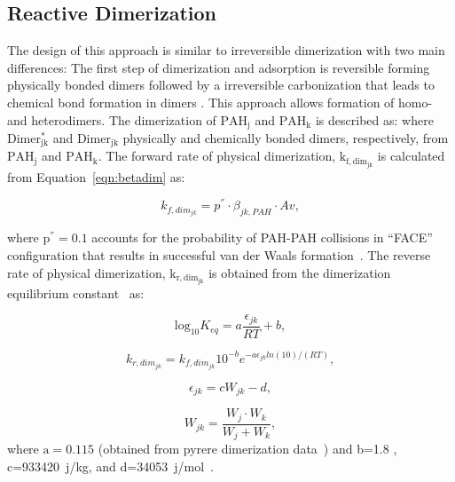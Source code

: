 \subsection{Reactive Dimerization}
The design of this approach is similar to irreversible dimerization with two main differences: The first step of dimerization and adsorption is reversible forming physically bonded dimers followed by a irreversible carbonization that leads to chemical bond formation in dimers \citep{kholghy2018reactive}. This approach allows formation of homo- and heterodimers. The dimerization of $\mathrm{PAH_j}$ and $\mathrm{PAH_k}$ is described as:
\noindent where $\mathrm{Dimer^*_{jk}}$ and $\mathrm{Dimer_{jk}}$ physically and chemically bonded dimers, respectively, from $\mathrm{PAH_j}$ and $\mathrm{PAH_k}$. The forward rate of physical dimerization, $\mathrm{k_{f,dim_{jk}}}$ is calculated from Equation~\eqref{eqn:betadim} as:

\begin{equation}
	k_{f,dim_{jk}}=
	p^{''}\cdot\beta_{jk,PAH}\cdot Av
	\label{eqn:kfphydim_reacdim},
\end{equation}

where $\mathrm{p^{''}}=0.1$ accounts for the probability of PAH-PAH collisions in “FACE” configuration that results in successful van der Waals formation~\citep{miller1984intermolecular}. The reverse rate of physical dimerization, $\mathrm{k_{r,dim_{jk}}}$ is obtained from the dimerization equilibrium constant~\citep{miller1991kinetics} as:
	
\begin{equation}
	\mathrm{log}_{10}K_{eq}=
	a\frac{\epsilon_{jk}}{RT}+b
	\label{eqn:keq_reacdim},
\end{equation}

\begin{equation}
	k_{r,dim_{jk}} = k_{f,dim_{jk}}10^{-b}e^{-a\epsilon_{jk} ln(10)/(RT)}
	\label{eqn:krphydim_reacdim},
\end{equation}

\begin{equation}
	\epsilon_{jk} = cW_{jk} -d
	\label{eqn:epsilon_reacdim},
\end{equation}

\begin{equation}
	W_{jk} = \frac{W_j\cdot W_k}{W_j+W_k}
	\label{eqn:Wjk_reacdim},
\end{equation}
\noindent where $\mathrm{a=0.115}$ (obtained from pyrere dimerization data~\cite{sabbah2010exploring}) and b=1.8 \cite{kholghy2018reactive}, c=933420~j/kg, and d=34053~j/mol~\cite{kholghy2018reactive}. 

